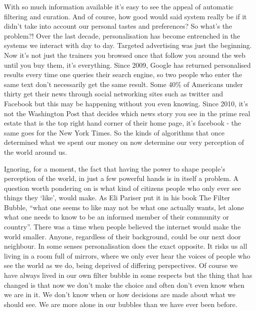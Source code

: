 With so much information available it's easy to see the appeal of automatic filtering and curation. And of course, how good would said system really be if it didn't take into account our personal tastes and preferences? So what's the problem?! Over the last decade, personalisation has become entrenched in the systems we interact with day to day. Targeted advertising was just the beginning. Now it's not just the trainers you browsed once that follow you around the web until you buy them, it's everything. Since 2009, Google has returned personalised results every time one queries their search engine, so two people who enter the same text don't necessarily get the same result. Some 40\% of Americans under thirty get their news through social networking sites such as twitter and Facebook but this may be happening without you even knowing. Since 2010, it's not the Washington Post that decides which news story you see in the prime real estate that is the top right hand corner of their home page, it's facebook - the same goes for the New York Times. So the kinds of algorithms that once determined what we spent our money on now determine our very perception of the world around us.

Ignoring, for a moment, the fact that having the power to shape people's perception of the world, in just a few powerful hands is in itself a problem. A question worth pondering on is what kind of citizens people who only ever see things they `like', would make. As Eli Pariser put it in his book The Filter Bubble, ``what one seems to like may not be what one actually wants, let alone what one needs to know to be an informed member of their community or country''. There was a time when people believed the internet would make the world smaller. Anyone, regardless of their background, could be our next door neighbour. In some senses personalisation does the exact opposite. It risks us all living in a room full of mirrors, where we only ever hear the voices of people who see the world as we do, being deprived of differing perspectives. Of course we have always lived in our own filter bubble in some respects but the thing that has changed is that now we don't make the choice and often don't even know when we are in it. We don't know when or how decisions are made about what we should see. We are more alone in our bubbles than we have ever been before.


